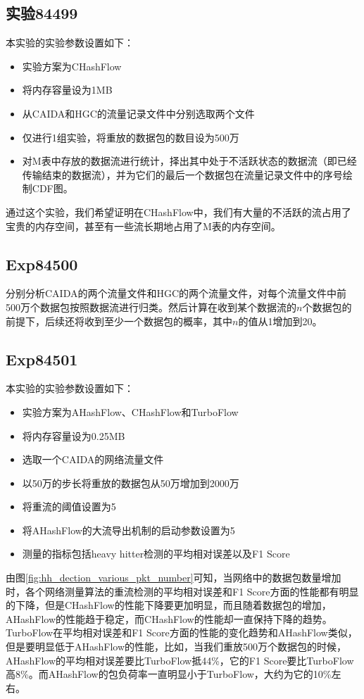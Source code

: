 \documentclass{article}
\begin{document}
\subsection{实验84499}
本实验的实验参数设置如下：
\begin{itemize}
	\item 实验方案为CHashFlow
	\item 将内存容量设为1MB
	\item 从CAIDA和HGC的流量记录文件中分别选取两个文件
	\item 仅进行1组实验，将重放的数据包的数目设为500万
	\item 对M表中存放的数据流进行统计，择出其中处于不活跃状态的数据流（即已经传输结束的数据流），并为它们的最后一个数据包在流量记录文件中的序号绘制CDF图。
\end{itemize}
通过这个实验，我们希望证明在CHashFlow中，我们有大量的不活跃的流占用了宝贵的内存空间，甚至有一些流长期地占用了M表的内存空间。

\subsection{Exp84500}
分别分析CAIDA的两个流量文件和HGC的两个流量文件，对每个流量文件中前500万个数据包按照数据流进行归类。然后计算在收到某个数据流的$n$个数据包的前提下，后续还将收到至少一个数据包的概率，其中$n$的值从1增加到20。

\subsection{Exp84501}
本实验的实验参数设置如下：
\begin{itemize}
	\item 实验方案为AHashFlow、CHashFlow和TurboFlow
	\item 将内存容量设为0.25MB
	\item 选取一个CAIDA的网络流量文件
	\item 以50万的步长将重放的数据包从50万增加到2000万
	\item 将重流的阈值设置为5
	\item 将AHashFlow的大流导出机制的启动参数设置为5
	\item 测量的指标包括heavy hitter检测的平均相对误差以及F1 Score
\end{itemize}

由图\ref{fig:hh_dection_various_pkt_number}可知，当网络中的数据包数量增加时，各个网络测量算法的重流检测的平均相对误差和F1 Score方面的性能都有明显的下降，但是CHashFlow的性能下降要更加明显，而且随着数据包的增加，AHashFlow的性能趋于稳定，而CHashFlow的性能却一直保持下降的趋势。TurboFlow在平均相对误差和F1 Score方面的性能的变化趋势和AHashFlow类似，但是要明显低于AHashFlow的性能，比如，当我们重放500万个数据包的时候，AHashFlow的平均相对误差要比TurboFlow抵44\%，它的F1 Score要比TurboFlow高8\%。而AHashFlow的包负荷率一直明显小于TurboFlow，大约为它的10\%左右。
\end{document}
